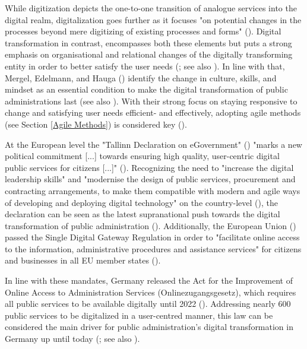 While digitization depicts the one-to-one transition of analogue services into the digital realm, digitalization goes further as it focuses "on potential changes in the processes beyond mere digitizing of existing processes and forms" (\cite[p. 12]{Mergel2019a}). Digital transformation in contrast, encompasses both these elements but puts a strong emphasis on organisational and relational changes of the digitally transforming entity in order to better satisfy the user needs (\cite{Mergel2019a}; see also \cite{Vial2019, Henriette2015}). In line with that, Mergel, Edelmann, and Hauga (\cite*{Mergel2019a}) identify the change in culture, skills, and mindset as an essential condition to make the digital transformation of public administrations last (see also \cite{Dierks2020, Parcell2013}). With their strong focus on staying responsive to change and satisfying user needs efficient- and effectively, adopting agile methods (see Section \ref{Agile Methods}) is considered key (\cite{Mergel2018,Beyer2010, Mergel2019, osmundsen2020, Andriole2018}).\par 
At the European level the "Tallinn Declaration on eGovernment" (\cite*{EuropeanCommission2017}) "marks a new political commitment [...] towards ensuring high quality, user-centric digital public services for citizens [...]" (\cite{EuropeanCommission2017a}). Recognizing the need to "increase the digital leadership skills" and "modernise the design of public services, procurement and contracting arrangements, to make them compatible with modern and agile ways of developing and deploying digital technology" on the country-level (\cite[p. 7]{EuropeanCommission2017}), the declaration can be seen as the latest supranational push towards the digital transformation of public administration (\cite{Mergel2019a}). Additionally, the European Union (\cite*{EuropeanUnion2018}) passed the Single Digital Gateway Regulation in order to "facilitate online access to the information, administrative procedures and assistance services" for citizens and businesses in all EU member states (\cite{EuropeanCommission2018a}).\par 
In line with these mandates, Germany released the Act for the Improvement of Online Access to Administration Services (Onlinezugangsgesetz), which requires all public services to be available digitally until 2022 (\cite{DeutscherBundestag2017}). Addressing nearly 600 public services to be digitalized in a user-centred manner, this law can be considered the main driver for public administration's digital transformation in Germany up until today (\cite{Mergel2019, BundesministeriumdesInnerenfurBauundHeimat2017}; see also \cite{EuropeanCommission2019a}).\par 
